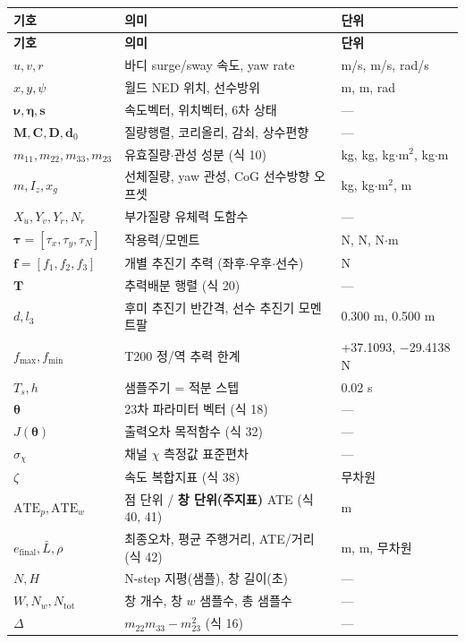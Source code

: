 \documentclass[10pt,a4paper]{article}
\begin{document}
{\footnotesize\setlength{\tabcolsep}{3pt}
\begin{longtable}{@{}lll@{}}
\toprule
\textbf{기호} & \textbf{의미} & \textbf{단위} \\
\midrule
\endfirsthead
\toprule
\textbf{기호} & \textbf{의미} & \textbf{단위} \\
\midrule
\endhead
\bottomrule
\endlastfoot
$u, v, r$ & 바디 surge/sway 속도, yaw rate & m/s, m/s, rad/s \\
$x, y, \psi$ & 월드 NED 위치, 선수방위 & m, m, rad \\
$\boldsymbol{\nu}, \boldsymbol{\eta}, \mathbf{s}$ & 속도벡터, 위치벡터, 6차 상태 & --- \\
$\mathbf{M}, \mathbf{C}, \mathbf{D}, \mathbf{d}_0$ & 질량행렬, 코리올리, 감쇠, 상수편향 & --- \\
$m_{11}, m_{22}, m_{33}, m_{23}$ & 유효질량$\cdot$관성 성분 (식 10) & kg, kg, kg$\cdot$m$^2$, kg$\cdot$m \\
$m, I_z, x_g$ & 선체질량, yaw 관성, CoG 선수방향 오프셋 & kg, kg$\cdot$m$^2$, m \\
$X_{\dot u}, Y_{\dot v}, Y_{\dot r}, N_{\dot r}$ & 부가질량 유체력 도함수 & --- \\
$\boldsymbol{\tau} = [\tau_x, \tau_y, \tau_N]$ & 작용력/모멘트 & N, N, N$\cdot$m \\
$\mathbf{f} = [f_1, f_2, f_3]$ & 개별 추진기 추력 (좌후$\cdot$우후$\cdot$선수) & N \\
$\mathbf{T}$ & 추력배분 행렬 (식 20) & --- \\
$d, l_3$ & 후미 추진기 반간격, 선수 추진기 모멘트팔 & 0.300 m, 0.500 m \\
$f_{\max}, f_{\min}$ & T200 정/역 추력 한계 & +37.1093, $-$29.4138 N \\
$T_s, h$ & 샘플주기 = 적분 스텝 & 0.02 s \\
$\boldsymbol{\theta}$ & 23차 파라미터 벡터 (식 18) & --- \\
$J(\boldsymbol{\theta})$ & 출력오차 목적함수 (식 32) & --- \\
$\sigma_\chi$ & 채널 $\chi$ 측정값 표준편차 & --- \\
$\zeta$ & 속도 복합지표 (식 38) & 무차원 \\
$\mathrm{ATE}_p, \mathrm{ATE}_w$ & 점 단위 / \textbf{창 단위(주지표)} ATE (식 40, 41) & m \\
$e_{\text{final}}, \bar{L}, \rho$ & 최종오차, 평균 주행거리, ATE/거리 (식 42) & m, m, 무차원 \\
$N, H$ & N-step 지평(샘플), 창 길이(초) & --- \\
$W, N_w, N_{\text{tot}}$ & 창 개수, 창 $w$ 샘플수, 총 샘플수 & --- \\
$\Delta$ & $m_{22}m_{33} - m_{23}^2$ (식 16) & --- \\
\end{longtable}}
\end{document}
